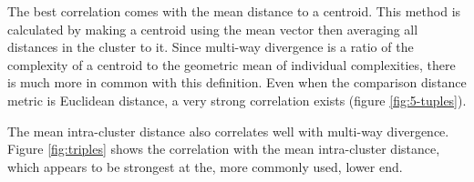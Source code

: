
The best correlation comes with the mean distance to a centroid.  This method is calculated by making a centroid using the mean vector then averaging all distances in the cluster to it.  Since multi-way divergence is a ratio of the complexity of a centroid to the geometric mean of individual complexities, there is much more in common with this definition.  Even when the comparison distance metric is Euclidean distance, a very strong correlation exists (figure \ref{fig:5-tuples}).

The mean intra-cluster distance also correlates well with multi-way divergence.  Figure \ref{fig:triples} shows the correlation with the mean intra-cluster distance, which appears to be strongest at the, more commonly used, lower end.  

